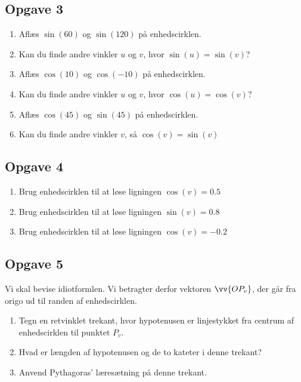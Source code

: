 


\subsection*{Opgave 3}

\begin{enumerate}[label=\roman*)]
	\item Aflæs $\sin(60)$ og $\sin(120)$ på enhedscirklen. 
	\item Kan du finde andre vinkler $u$ og $v$, hvor 
	$\sin(u)=\sin(v)?$
	\item Aflæs $\cos(10)$ og $\cos(-10)$ på enhedscirklen.
	\item Kan du finde andre vinkler $u$ og $v$, hvor 
	$\cos(u)=\cos(v)?$
	\item Aflæs $\cos(45)$ og $\sin(45)$ på enhedscirklen. 
	\item Kan du finde andre vinkler $v$, så $\cos(v)=\sin(v)$
\end{enumerate}

\subsection*{Opgave 4}
\begin{enumerate}[label=\roman*)]
	\item Brug enhedscirklen til at løse ligningen $\cos(v) = 0.5$
	\item Brug enhedscirklen til at løse ligningen $\sin(v) = 0.8$
	\item Brug enhedscirklen til at løse ligningen $\cos(v) = -0.2$
\end{enumerate}

\subsection*{Opgave 5}
Vi skal bevise idiotformlen. Vi betragter derfor vektoren $\vv{OP_v}$, der går fra origo ud til randen af enhedscirklen.
\begin{enumerate}[label=\roman*)]
	\item Tegn en retvinklet trekant, hvor hypotenusen er linjestykket fra centrum af enhedscirklen til 
	punktet $P_v$. 
	\item Hvad er længden af hypotenusen og de to kateter i denne trekant?
	\item Anvend Pythagoras' læresætning på denne trekant.
\end{enumerate}

